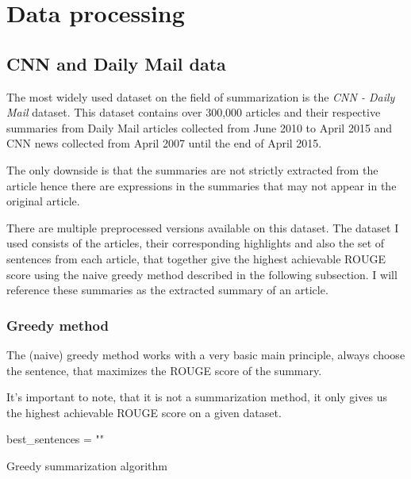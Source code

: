 \chapter{Data processing}\label{sect:DataProcessing}
\section{CNN and Daily Mail data}
The most widely used dataset on the field of summarization is the \textit{CNN - Daily Mail} dataset.
This dataset contains over 300,000 articles and their respective summaries from Daily Mail articles collected from June 2010 to April 2015 and CNN news collected from April 2007 until the end of April 2015.~\cite{CNN_DM}

The only downside is that the summaries are not strictly extracted from the article hence there are expressions in the summaries that may not appear in the original article.

There are multiple preprocessed versions available on this dataset. The dataset I used consists of the articles, their corresponding highlights and also the set of sentences from each article, that together give the highest achievable ROUGE score using the naive greedy method described in the following subsection. I will reference these summaries as the extracted summary of an article.

\subsection{Greedy method}
The (naive) greedy method works with a very basic main principle, always choose the sentence, that maximizes the ROUGE score of the summary.

It's important to note, that it is not a summarization method, it only gives us the highest achievable ROUGE score on a given dataset.

\begin{algorithm}
	\SetAlgoLined
	best\_sentences = ""\;
	\caption{Greedy summarization algorithm}
\end{algorithm}

